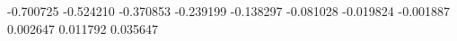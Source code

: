 -0.700725
-0.524210
-0.370853
-0.239199
-0.138297
-0.081028
-0.019824
-0.001887
0.002647
0.011792
0.035647
